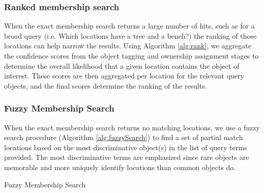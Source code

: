 \subsubsection{\textbf{Ranked membership search}}
When the exact membership search returns a large number of hits, such as for a broad query (i.e. Which locations have a tree and a bench?) the ranking of those locations can help narrow the results. Using Algorithm \ref{alg:rank}, we aggregate the confidence scores from the object tagging and ownership assignment stages to determine the overall likelihood that a given location contains the object of interest. These scores are then aggregated per location for the relevant query objects, and the final scores determine the ranking of the results. 




\subsubsection{\textbf{Fuzzy Membership Search}}
When the exact membership search returns no matching locations, we use a fuzzy search procedure (Algorithm \ref{alg:fuzzySearch}) to find a set of partial match locations based on the most discriminative object(s) in the list of query terms provided. 
The most discriminative terms are emphasized since rare objects are memorable and more uniquely identify locations than common objects do.

\begin{algorithm}
    \caption{Fuzzy Membership Search}\label{alg:fuzzySearch}
    \begin{algorithmic}[2]
        \State{- - - - -}
                \Else
                \EndIf
            \EndIf
            \EndIf
        \EndProcedure
    \end{algorithmic}
\end{algorithm}

